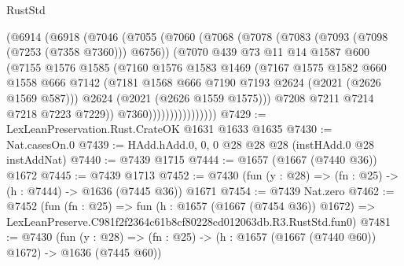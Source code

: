 \begin{lexlean}{RustStd}
\begin{coremodule}
                    (@6914
                      (@6918
                        (@7046
                          (@7055
                            (@7060
                              (@7068
                                (@7078
                                  (@7083 (@7093 (@7098 (@7253 (@7358 @7360))) @6756))
                                  (@7070
                                    @439
                                    @73
                                    @11
                                    @14
                                    @1587
                                    @600
                                    (@7155
                                      @1576
                                      @1585
                                      (@7160
                                        @1576
                                        @1583
                                        @1469
                                        (@7167
                                          @1575
                                          @1582
                                          @660
                                          @1558
                                          @666
                                          @7142
                                          (@7181
                                            @1568
                                            @666
                                            @7190
                                            @7193
                                            @2624
                                            (@2021 (@2626 @1569 @587)))
                                          @2624
                                          (@2021 (@2626 @1559 @1575)))
                                        @7208
                                        @7211
                                        @7214
                                        @7218
                                        @7223
                                        @7229))
                                    @7360))))))))))))))))
@7429 := LexLeanPreservation.Rust.CrateOK @1631 @1633 @1635
@7430 := Nat.casesOn.{0}
@7439 := HAdd.hAdd.{0, 0, 0} @28 @28 @28 (instHAdd.{0} @28 instAddNat)
@7440 := @7439 @1715
@7444 := @1657 (@1667 (@7440 @36)) @1672
@7445 := @7439 @1713
@7452 := @7430 (fun (y : @28) => (fn : @25) -> (h : @7444) -> @1636 (@7445 @36)) @1671
@7454 := @7439 Nat.zero
@7462 := @7452
    (fun (fn : @25) =>
    fun (h : @1657 (@1667 (@7454 @36)) @1672) =>
    LexLeanPreserve.C981f2f2364c61b8cf80228cd012063db.R3.RustStd.fun0)
@7481 := @7430
    (fun (y : @28) => (fn : @25) -> (h : @1657 (@1667 (@7440 @60)) @1672) -> @1636 (@7445 @60))

\end{coremodule}
\end{lexlean}
